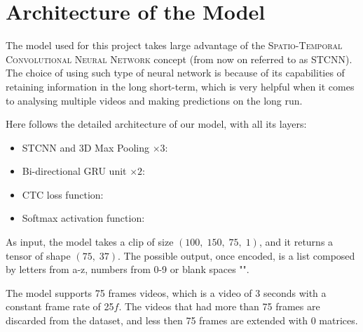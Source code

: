 \documentclass[11pt,journal]{IEEEtran}
\newcommand{\nl}{

\medskip

}
\begin{document}
\section{Architecture of the Model}

The model used for this project takes large advantage of the \textsc{Spatio-Temporal Convolutional Neural Network} concept \cite{gunileo:stcnn} (from now on referred to as STCNN). The choice of using such type of neural network is because of its capabilities of retaining information in the long short-term, which is very helpful when it comes to analysing multiple videos and making predictions on the long run.
\nl
Here follows the detailed architecture of our model, with all its layers:
\begin{itemize}
    \item STCNN and 3D Max Pooling $\times 3$:
    \item Bi-directional GRU unit $\times 2$:
    \item CTC loss function:
    \item Softmax activation function:
\end{itemize}

As input, the model takes a clip of size $(100, \; 150, \; 75, \; 1)$, and it returns a tensor of shape $(75, \; 37)$. The possible output, once encoded, is a list composed by letters from a-z, numbers from 0-9 or blank spaces "\textvisiblespace".
\nl
The model supports 75 frames videos, which is a video of 3 seconds with a constant frame rate of 25$f$. The videos that had more than 75 frames are discarded from the dataset, and less then 75 frames are extended with 0 matrices.



\end{document}
